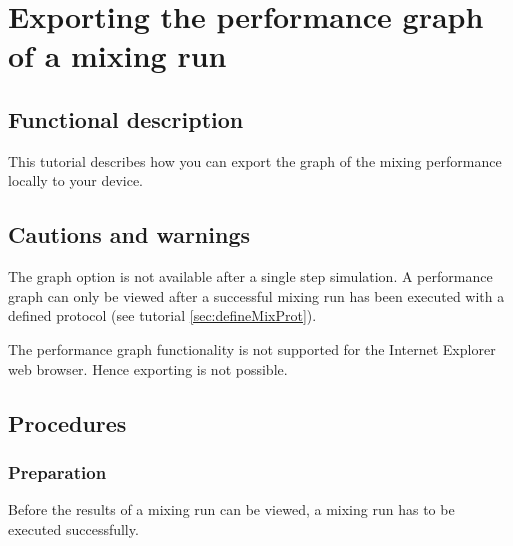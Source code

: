 
\section{Exporting the performance graph of a mixing run}
\label{sec:exportSingleGraph}

\subsection{Functional description}
This tutorial describes how you can export the graph of the mixing performance locally to your device.

\subsection{Cautions and warnings}
The graph option is not available after a single step simulation. A performance graph can only be viewed after a successful mixing run has been executed with a defined protocol (see tutorial \ref{sec:defineMixProt}).

The performance graph functionality is not supported for the Internet Explorer web browser. Hence exporting is not possible.

\subsection{Procedures}
\subsubsection{Preparation}
Before the results of a mixing run can be viewed, a mixing run has to be executed successfully.

